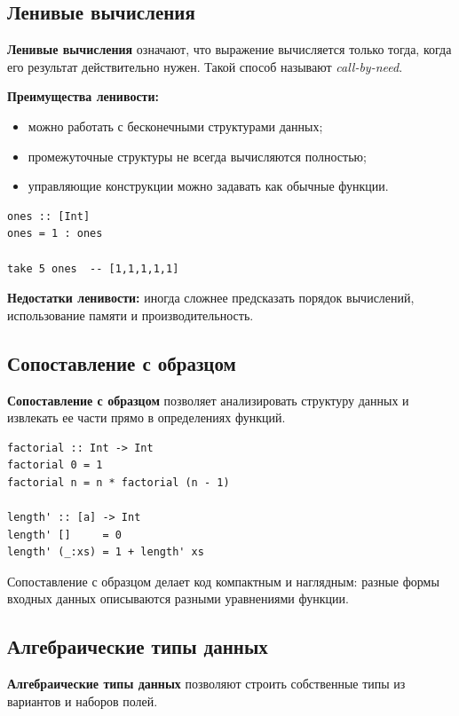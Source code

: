 \subsection*{Ленивые вычисления}

\textbf{Ленивые вычисления} означают, что выражение вычисляется только тогда, когда его результат действительно нужен. Такой способ называют \textit{call-by-need}.

\textbf{Преимущества ленивости:}
\begin{itemize}
    \item можно работать с бесконечными структурами данных;
    \item промежуточные структуры не всегда вычисляются полностью;
    \item управляющие конструкции можно задавать как обычные функции.
\end{itemize}

\begin{verbatim}
ones :: [Int]
ones = 1 : ones

take 5 ones  -- [1,1,1,1,1]
\end{verbatim}

\textbf{Недостатки ленивости:} иногда сложнее предсказать порядок вычислений, использование памяти и производительность.

\subsection*{Сопоставление с образцом}

\textbf{Сопоставление с образцом} позволяет анализировать структуру данных и извлекать ее части прямо в определениях функций.

\begin{verbatim}
factorial :: Int -> Int
factorial 0 = 1
factorial n = n * factorial (n - 1)

length' :: [a] -> Int
length' []     = 0
length' (_:xs) = 1 + length' xs
\end{verbatim}

Сопоставление с образцом делает код компактным и наглядным: разные формы входных данных описываются разными уравнениями функции.

\subsection*{Алгебраические типы данных}

\textbf{Алгебраические типы данных} позволяют строить собственные типы из вариантов и наборов полей.

